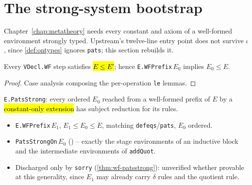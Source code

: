 \section{The strong-system bootstrap}

Chapter~\ref{chap:metatheory} needs every constant and axiom of a well-formed environment
strongly typed. Upstream's twelve-line entry point does not survive $\iota$, since
\ref{def:ontypes} ignores \texttt{pats}; this section rebuilds it.

\begin{lemma}
\label{thm:vdecl-wf-le}
\leanok
{}

 Every \texttt{VDecl.WF} step satisfies \hl{$E \le E'$}; hence
\texttt{E.WFPrefix}\,$E_0$ implies $E_0 \le E$.
\end{lemma}
\begin{proof}
\leanok
{} Case analysis composing the per-operation \texttt{le} lemmas.
\end{proof}

\begin{definition}
\label{def:patsstrong}
\leanok
{}

 \texttt{E.PatsStrong}: every ordered $E_0$ reached from a well-formed prefix
of $E$ by a \hl{constant-only extension} has subject reduction for its rules.
\begin{itemize}
\item {} \texttt{E.WFPrefix}\,$E_1$, $E_1 \le E_0 \le E$, matching
  \texttt{defeqs}/\texttt{pats}, $E_0$ ordered.
\item {} \texttt{PatsStrongOn}\,$E_0$
  () -- exactly the stage environments of
  an inductive block and the intermediate environments of \texttt{addQuot}.
\item {} Discharged only by \texttt{sorry} (\ref{thm:wf-patsstrong}): unverified
  whether provable at this generality, since $E_1$ may already carry $\delta$ rules and the
  quotient rule.
\end{itemize}
\end{definition}

